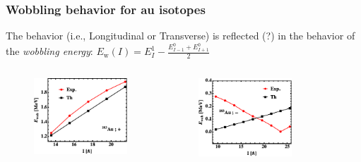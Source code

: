 \documentclass{beamer}
\begin{document}
\begin{frame}
    \frametitle{Wobbling behavior for au isotopes}
    The behavior (i.e., Longitudinal or Transverse) is reflected (?) in the behavior of the \emph{wobbling energy}: $E_\text{w}(I)=E_I^1-\frac{E_{I-1}^0+E_{I+1}^0}{2}$
    \begin{columns}
    \begin{column}{.33\textwidth}
    \begin{figure}
        \centering
        \includegraphics[scale=0.3]{figs/wobbling_183_positive.png}
    \end{figure}
    \end{column}
    \begin{column}{.33\textwidth}
    \begin{figure}
        \centering
        \includegraphics[scale=0.3]{figs/wobbling_183_negative.png}
    \end{figure}
    \end{column}
    \begin{column}{.33\textwidth}
    \begin{figure}

\end{figure}
\end{column}
\end{columns}
\end{frame}
\end{document}
